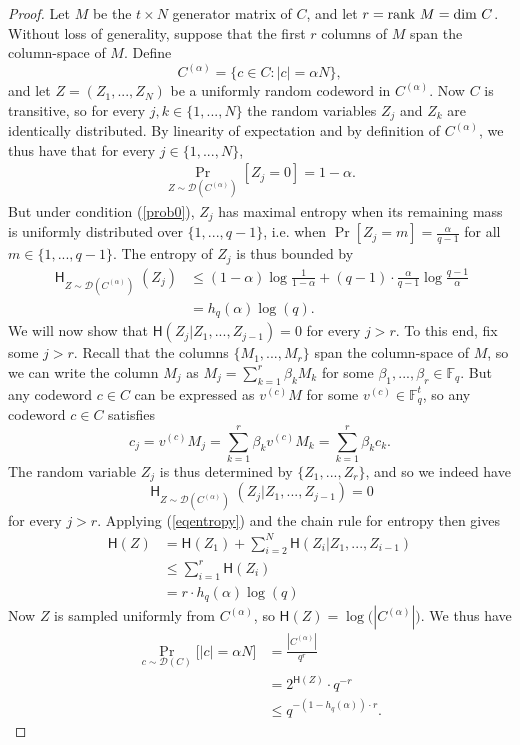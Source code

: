 \documentclass[12pt]{article}
\newcommand{\F}{\mathbb{F}}
\begin{document}
\begin{proof}
Let $M$ be the $t\times N$ generator matrix of $C$, and let $r=\textnormal{rank }M=\textnormal{dim }C$. Without loss of generality, suppose that the first $r$ columns of $M$ span the column-space of $M$. Define
$$C^{(\alpha)}=\{c\in C: |c|=\alpha N\},$$
and let $Z=(Z_1,...,Z_N)$ be a uniformly random codeword in $C^{(\alpha)}$. Now $C$ is transitive, so for every $j,k\in\{1,...,N\}$ the random variables $Z_j$ and $Z_k$ are identically distributed. By linearity of expectation and by definition of $C^{(\alpha)}$, we thus have that for every $j\in \{1,...,N\}$,
\begin{align}\label{prob0}
\Pr_{Z\sim \mathcal{D}(C^{(\alpha)})}[Z_j= 0]=1-\alpha.
\end{align}
But under condition (\ref{prob0}), $Z_j$ has maximal entropy when its remaining mass is uniformly distributed over $\{1,...,q-1\}$, i.e. when $\Pr[Z_j=m]=\frac{\alpha}{q-1}$ for all $m\in\{1,...,q-1\}$. The entropy of $Z_j$ is thus bounded by
\begin{align}\label{eqentropy}
\mathop{\mathsf{H}}_{Z\sim \mathcal{D}(C^{(\alpha)})}(Z_j)&\leq (1-\alpha)\log\frac{1}{1-\alpha}+(q-1)\cdot\frac{\alpha}{q-1}\log\frac{q-1}{\alpha}\nonumber\\
&=h_q(\alpha)\log(q).
\end{align}
We will now show that $\mathsf{H}(Z_j |Z_1,...,Z_{j-1})=0$ for every $j>r$. To this end, fix some $j>r$. Recall that the columns $\{M_1,...,M_r \}$ span the column-space of $M$, so we can write the column $M_j$ as $M_j=\sum_{k=1}^r \beta_k M_k$ for some $\beta_1,...,\beta_r\in\F_q$. But any codeword $c\in C$ can be expressed as $v^{(c)}M$ for some $v^{(c)}\in\mathbb{F}_q
^t$, so any codeword $c\in C$ satisfies $$c_j=v^{(c)}M_j=\sum_{k=1}^r\beta_k v^{(c)}M_k=\sum_{k=1}^r\beta_k c_k.$$
The random variable $Z_j$ is thus determined by $\{Z_1,...,Z_r \}$, and so we indeed have 
$$\mathop{\mathsf{H}}_{Z\sim \mathcal{D}(C^{(\alpha)})}(Z_j|Z_1,...,Z_{j-1})=0$$
for every $j>r$. Applying (\ref{eqentropy}) and the chain rule for entropy then gives
\begin{align*}
    \mathsf{H}(Z)&=\mathsf{H}(Z_1)+\sum_{i=2}^N\mathsf{H}(Z_i |Z_1,...,Z_{i-1})    \\
    &\leq \sum_{i=1}^{r}\mathsf{H}(Z_i)  \\
    &=r \cdot h_q(\alpha)\log(q)
\end{align*}
Now $Z$ is sampled uniformly from $C^{(\alpha)}$, so $\mathsf{H}(Z)=\log \Big( |C^{(\alpha)}|\Big)$. We thus have
\begin{align*}
 \Pr_{c\sim \mathcal{D}(C)}\Big[|c| = \alpha N\Big] &=\frac{\left|C^{(\alpha)}\right|}{q^r} \\
&=2^{\mathsf{H}(Z)}\cdot q^{-r}\\
&\leq q^{-(1-h_q(\alpha))\cdot r }.
\end{align*}
\end{proof}
\end{document}
